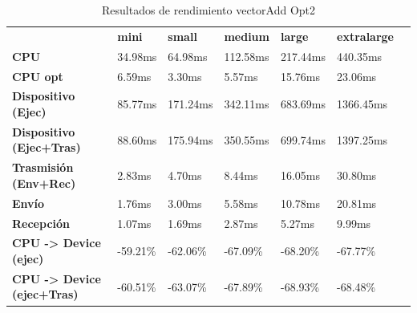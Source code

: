 \begin{table}[H]
    \centering
    \begin{tabular}{lllllll}
    \rowcolor[HTML]{DAE8FC} \ &  \textbf{mini} &  \textbf{small} &  \textbf{medium} &  \textbf{	large} &  \textbf{	extralarge} \\
    \cellcolor[HTML]{DAE8FC} \textbf{CPU} & 34.98ms & 64.98ms & 112.58ms & 	217.44ms & 	440.35ms \\
    \rowcolor[HTML]{EFEFEF} \cellcolor[HTML]{DAE8FC} \textbf{CPU opt} & 6.59ms & 3.30ms & 5.57ms & 	15.76ms & 	23.06ms \\
    \cellcolor[HTML]{DAE8FC} \textbf{Dispositivo (Ejec)} & 85.77ms & 171.24ms & 342.11ms & 	683.69ms & 	1366.45ms \\
    \rowcolor[HTML]{EFEFEF} \cellcolor[HTML]{DAE8FC} \textbf{Dispositivo (Ejec+Tras)} & 88.60ms & 175.94ms & 350.55ms & 	699.74ms & 	1397.25ms \\
    \cellcolor[HTML]{DAE8FC} \textbf{Trasmisión (Env+Rec)} & 2.83ms & 4.70ms & 8.44ms & 	16.05ms & 	30.80ms \\
    \rowcolor[HTML]{EFEFEF} \cellcolor[HTML]{DAE8FC} \textbf{Envío} & 1.76ms & 3.00ms & 5.58ms & 	10.78ms & 	20.81ms \\
    \cellcolor[HTML]{DAE8FC} \textbf{Recepción} & 1.07ms & 1.69ms & 2.87ms & 	5.27ms & 	9.99ms \\
    \rowcolor[HTML]{EFEFEF} \cellcolor[HTML]{DAE8FC} \textbf{CPU -> Device (ejec)} & -59.21\% & -62.06\% & -67.09\% & 	-68.20\% & 	-67.77\% \\
    \cellcolor[HTML]{DAE8FC} \textbf{CPU -> Device (ejec+Tras)} & -60.51\% & -63.07\% & -67.89\% & 	-68.93\% & 	-68.48\% \\
    \end{tabular}
    \caption[Resultados de rendimiento vectorAdd Opt2]{{Resultados de rendimiento vectorAdd Opt2}}
    \label{table_test_vectorAdd_Opt2_hw_performanceResults}
\end{table}